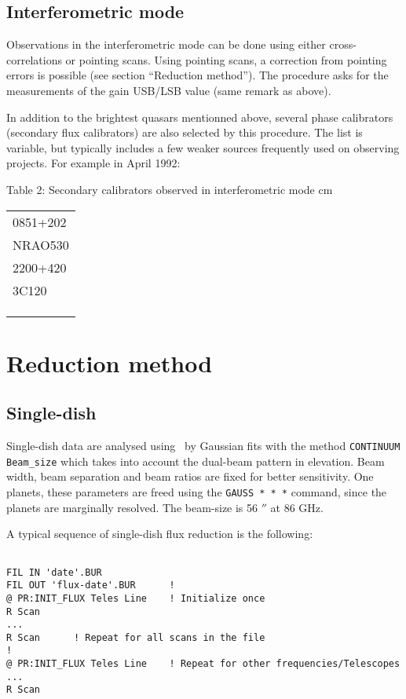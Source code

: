 \documentclass[11pt]{article}
\begin{document}
\subsection{ Interferometric mode}

Observations in the interferometric mode can be done using either
cross-correlations or pointing scans. Using pointing scans, a correction
from pointing errors is possible (see section ``Reduction method'').  The
procedure asks for the measurements of the gain USB/LSB value (same remark
as above).

In addition to the brightest quasars mentionned above, several phase
calibrators (secondary flux calibrators) are also selected by this
procedure.  The list is variable, but typically includes a few weaker
sources frequently used on observing projects. For example in April 1992:

\begin{flushleft}
  {Table 2: Secondary calibrators observed in interferometric mode}  cm
\begin{tabular}{|l|}
\hline
\hline
0851+202\\
NRAO530\\
2200+420\\
3C120\\
\\
\\
\\
\hline
\hline
\end{tabular}
\end{flushleft}

\section{Reduction method}

\subsection{Single-dish}

Single-dish data are analysed using \class\ by Gaussian fits with the
method {\tt CONTINUUM Beam\_size} which takes into account the dual-beam
pattern in elevation. Beam width, beam separation and beam ratios are fixed
for better sensitivity. One planets, these parameters are freed using the
{\tt GAUSS * * *} command, since the planets are marginally resolved. The
beam-size is 56 $''$ at 86 GHz.

A typical sequence of single-dish flux reduction is the following:
\begin{verbatim}

FIL IN 'date'.BUR
FIL OUT 'flux-date'.BUR      !
@ PR:INIT_FLUX Teles Line    ! Initialize once
R Scan
...
R Scan      ! Repeat for all scans in the file
!
@ PR:INIT_FLUX Teles Line    ! Repeat for other frequencies/Telescopes
...
R Scan

\end{verbatim}
\end{document}
